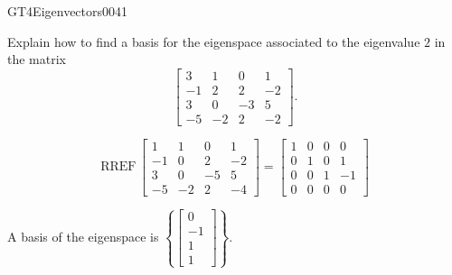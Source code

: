 \begin{exercise}{GT4}{Eigenvectors}{0041} 
\begin{exerciseStatement} 

Explain how to find a basis for the eigenspace associated to the eigenvalue \(2\) in the matrix \[\left[\begin{array}{cccc}
3 & 1 & 0 & 1 \\
-1 & 2 & 2 & -2 \\
3 & 0 & -3 & 5 \\
-5 & -2 & 2 & -2
\end{array}\right].\]

 \end{exerciseStatement}
 \begin{exerciseAnswer} 

\[\mathrm{RREF}\,\left[\begin{array}{cccc}
1 & 1 & 0 & 1 \\
-1 & 0 & 2 & -2 \\
3 & 0 & -5 & 5 \\
-5 & -2 & 2 & -4
\end{array}\right]=\left[\begin{array}{cccc}
1 & 0 & 0 & 0 \\
0 & 1 & 0 & 1 \\
0 & 0 & 1 & -1 \\
0 & 0 & 0 & 0
\end{array}\right]\]

 

A basis of the eigenspace is \(\left\{ \left[\begin{array}{c}
0 \\
-1 \\
1 \\
1
\end{array}\right] \right\}\).

 \end{exerciseAnswer}
 \end{exercise}


\newpage




